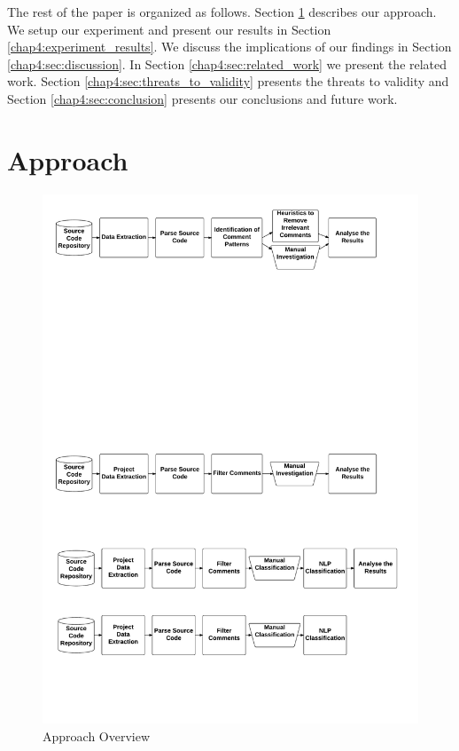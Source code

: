 The rest of the paper is organized as follows. Section \ref{chap4:sec:approach} describes our approach. We setup our experiment and present our
results in Section \ref{chap4:experiment_results}. We discuss the implications of our findings in Section \ref{chap4:sec:discussion}. In Section \ref{chap4:sec:related_work} we present the related work. Section \ref{chap4:sec:threats_to_validity} presents the threats to validity and Section \ref{chap4:sec:conclusion} presents our conclusions and future work.  

\section{Approach}
\label{chap4:sec:approach}

\begin{figure}[thb!]
  \centering
  \includegraphics[width=1\textwidth]{figures/chapter4/approach_reviwed.pdf}
  \caption{Approach Overview}
  \label{chap4:fig:approach}
\end{figure}

